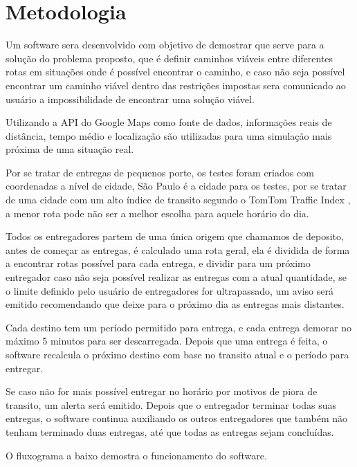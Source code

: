 \chapter{Metodologia}
Um software sera desenvolvido com objetivo de demostrar que serve para a solução do problema proposto, que é definir caminhos viáveis entre diferentes rotas em situações onde é possível encontrar o caminho, e caso não seja possível encontrar um caminho viável dentro das restrições impostas sera comunicado ao usuário a impossibilidade de encontrar uma solução viável.

Utilizando a API do Google Maps como fonte de dados, informações reais de distância, tempo médio e localização são utilizadas para uma simulação mais próxima de uma situação real.

Por se tratar de entregas de pequenos porte, os testes foram criados com coordenadas a nível de cidade, São Paulo é a cidade para os testes, por se tratar de uma cidade com um alto índice de transito segundo o TomTom Traffic Index \cite{TomTom}, a menor rota pode não ser a melhor escolha para aquele horário do dia.

Todos os entregadores partem de uma única origem que chamamos de deposito, antes de começar as entregas, é calculado uma rota geral, ela é dividida de forma a encontrar rotas possível para cada entrega, e dividir para um próximo entregador caso não seja possível realizar as entregas com a atual quantidade, se o limite definido pelo usuário de entregadores for ultrapassado, um aviso será emitido recomendando que deixe para o próximo dia as entregas mais distantes.

Cada destino tem um período permitido para entrega, e cada entrega demorar no máximo 5 minutos para ser descarregada. Depois que uma entrega é feita, o software recalcula o próximo destino com base no transito atual e o período para entregar.

Se caso não for mais possível entregar no horário por motivos de piora de transito, um alerta será emitido. Depois que o entregador terminar todas suas entregas, o software continua auxiliando os outros entregadores que também não tenham terminado duas entregas, até que todas as entregas sejam concluídas.

O fluxograma a baixo demostra o funcionamento do software.

\begin{minipage}{\linewidth}
    \label{fig:FluxoSoftware}
\end{minipage}

